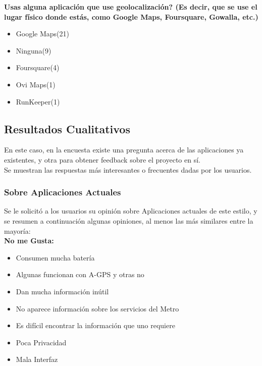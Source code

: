 \documentclass[10pt,letterpaper]{article}
\begin{document}
\textbf{Usas alguna aplicación que use geolocalización? (Es decir, que se use el lugar físico donde estás, como Google Maps, Foursquare, Gowalla, etc.)}

\begin{itemize}
\item Google Maps(21)
\item Ninguna(9)
\item Foursquare(4)
\item Ovi Maps(1)
\item RunKeeper(1)
\end{itemize}


\subsection{Resultados Cualitativos}

En este caso, en la encuesta existe una pregunta acerca de las aplicaciones ya existentes, y otra para obtener feedback sobre el proyecto en sí.\\

Se muestran las respuestas más interesantes o frecuentes dadas por los usuarios.\\

\subsubsection{Sobre Aplicaciones Actuales}

Se le solicitó a los usuarios su opinión sobre Aplicaciones actuales de este estilo, y se resumen a continuación algunas opiniones, al menos las más similares entre la mayoría:\\

\textbf{No me Gusta:}\\

\begin{itemize}
\item Consumen mucha batería
\item Algunas funcionan con A-GPS y otras no
\item Dan mucha información inútil
\item No aparece información sobre los servicios del Metro
\item Es difícil encontrar la información que uno requiere
\item Poca Privacidad
\item Mala Interfaz
\end{itemize}
\end{document}
